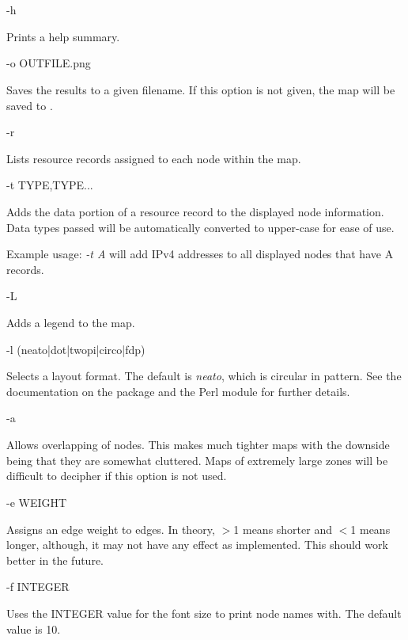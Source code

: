 \begin{description}

\item -h\verb" "

Prints a help summary.

\item -o OUTFILE.png\verb" "

Saves the results to a given filename.  If this option is not given, the map
will be saved to .

\item -r\verb" "

Lists resource records assigned to each node within the map.

\item -t TYPE,TYPE...\verb" "

Adds the data portion of a resource record to the displayed node
information.  Data types passed will be automatically converted to
upper-case for ease of use.

Example usage: {\it -t A} will add IPv4 addresses to
all displayed nodes that have A records.

\item -L\verb" "

Adds a legend to the map.

\item -l (neato|dot|twopi|circo|fdp)\verb" "

Selects a layout format.  The default is {\it neato}, which is circular in
pattern.  See the documentation on the  package and the
 Perl module for further details.

\item -a\verb" "

Allows overlapping of nodes.  This makes much tighter maps with the
downside being that they are somewhat cluttered.  Maps of extremely
large zones will be difficult to decipher if this option is not used.

\item -e WEIGHT\verb" "

Assigns an edge weight to edges.  In theory, $>$1 means shorter and $<$1 means
longer, although, it may not have any effect as implemented.
This should work better in the future.

\item -f INTEGER\verb" "

Uses the INTEGER value for the font size to print node names with.
The default value is 10.


\end{description}
